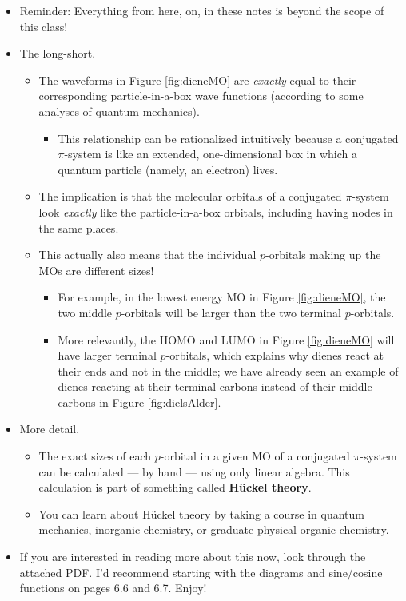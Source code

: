 \documentclass[../notes.tex]{subfiles}
\begin{document}
\begin{itemize}
    \begin{itemize}
        \item Reminder: Everything from here, on, in these notes is beyond the scope of this class!
        \item The long-short.
        \begin{itemize}
            \item The waveforms in Figure \ref{fig:dieneMO} are \emph{exactly} equal to their corresponding particle-in-a-box wave functions (according to some analyses of quantum mechanics).
            \begin{itemize}
                \item This relationship can be rationalized intuitively because a conjugated $\pi$-system is like an extended, one-dimensional box in which a quantum particle (namely, an electron) lives.
            \end{itemize}
            \item The implication is that the molecular orbitals of a conjugated $\pi$-system look \emph{exactly} like the particle-in-a-box orbitals, including having nodes in the same places.
            \item This actually also means that the individual $p$-orbitals making up the MOs are different sizes!
            \begin{itemize}
                \item For example, in the lowest energy MO in Figure \ref{fig:dieneMO}, the two middle $p$-orbitals will be larger than the two terminal $p$-orbitals.
                \item More relevantly, the HOMO and LUMO in Figure \ref{fig:dieneMO} will have larger terminal $p$-orbitals, which explains why dienes react at their ends and not in the middle; we have already seen an example of dienes reacting at their terminal carbons instead of their middle carbons in Figure \ref{fig:dielsAlder}.
            \end{itemize}
        \end{itemize}
        \item More detail.
        \begin{itemize}
            \item The exact sizes of each $p$-orbital in a given MO of a conjugated $\pi$-system can be calculated --- by hand --- using only linear algebra. This calculation is part of something called \textbf{H\"{u}ckel theory}.
            \item You can learn about H\"{u}ckel theory by taking a course in quantum mechanics, inorganic chemistry, or graduate physical organic chemistry.
        \end{itemize}
        \item If you are interested in reading more about this now, look through the attached PDF. I'd recommend starting with the diagrams and sine/cosine functions on pages 6.6 and 6.7. Enjoy!
    \end{itemize}
\end{itemize}


\end{document}
